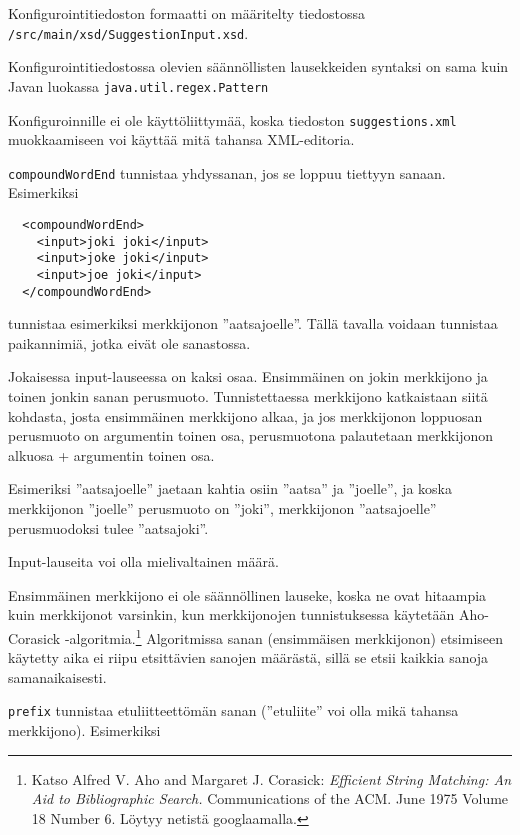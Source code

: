 \documentclass[12pt]{article}
\begin{document}
Konfigurointitiedoston formaatti on määritelty tiedostossa
\verb=/src/main/xsd/SuggestionInput.xsd=.

Konfigurointitiedostossa olevien säännöllisten lausekkeiden syntaksi on
sama kuin Javan luokassa \verb=java.util.regex.Pattern=

Konfiguroinnille ei ole käyttöliittymää, koska tiedoston
\verb=suggestions.xml= muokkaamiseen voi käyttää mitä tahansa
XML-editoria.




\bigskip
\verb|compoundWordEnd| tunnistaa yhdyssanan, jos se loppuu tiettyyn sanaan.
Esimerkiksi

\begin{verbatim}
  <compoundWordEnd>
    <input>joki joki</input>
    <input>joke joki</input>
    <input>joe joki</input>
  </compoundWordEnd>
\end{verbatim}

tunnistaa esimerkiksi merkkijonon ''aatsajoelle''. Tällä tavalla
voidaan tunnistaa paikannimiä, jotka eivät ole sanastossa.

Jokaisessa input-lauseessa on kaksi osaa. Ensimmäinen on jokin
merkkijono ja toinen jonkin sanan perusmuoto. Tunnistettaessa
merkkijono katkaistaan siitä kohdasta, josta ensimmäinen merkkijono
alkaa, ja jos merkkijonon loppuosan perusmuoto on argumentin toinen
osa, perusmuotona palautetaan merkkijonon alkuosa + argumentin toinen
osa.

Esimeriksi ''aatsajoelle'' jaetaan kahtia osiin ''aatsa'' ja
''joelle'', ja koska merkkijonon ''joelle'' perusmuoto on ''joki'',
merkkijonon ''aatsajoelle'' perusmuodoksi tulee ''aatsajoki''.

Input-lauseita voi olla mielivaltainen määrä.

Ensimmäinen merkkijono ei ole säännöllinen lauseke, koska ne ovat
hitaampia kuin merkkijonot varsinkin, kun merkkijonojen tunnistuksessa
käytetään Aho-Corasick -algoritmia.\footnote{Katso
Alfred V. Aho and Margaret J. Corasick:
\emph{Efficient String Matching: An Aid to Bibliographic Search.}
Communications of the ACM. June 1975 Volume 18 Number 6.
Löytyy netistä googlaamalla.} Algoritmissa sanan (ensimmäisen
merkkijonon) etsimiseen käytetty aika ei riipu etsittävien sanojen
määrästä, sillä se etsii kaikkia sanoja samanaikaisesti.



\bigskip
\verb|prefix| tunnistaa etuliitteettömän sanan (''etuliite'' voi olla
mikä tahansa merkkijono). Esimerkiksi
\end{document}

